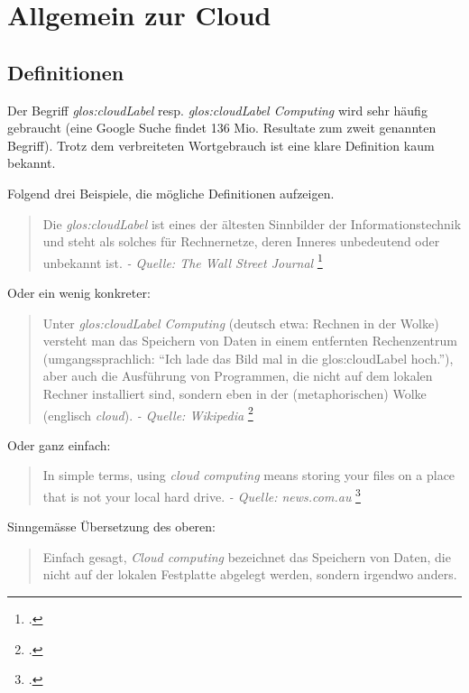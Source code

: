 \chapter{Allgemein zur Cloud}

\section{Definitionen}
\label{sec:cloud:definition}

Der Begriff \textit{\Gls{glos:cloudLabel}} resp. \textit{\Gls{glos:cloudLabel} Computing} wird sehr häufig gebraucht (eine Google Suche findet 136 Mio. Resultate zum zweit genannten Begriff).
Trotz dem verbreiteten Wortgebrauch ist eine klare Definition kaum bekannt.

Folgend drei Beispiele, die mögliche Definitionen aufzeigen.

\begin{quote}
	Die \textit{\Gls{glos:cloudLabel}} ist eines der ältesten Sinnbilder der Informationstechnik und steht als solches für Rechnernetze, deren Inneres unbedeutend oder unbekannt ist. \textit{- Quelle: The Wall Street Journal}  \footcite{The_Internet_Industry_Is_on_a_Cloud_--_Whatever_That_May_Mean_-_WSJ_2014-10-03}
\end{quote}

Oder ein wenig konkreter:

\begin{quote}
	Unter \textit{\Gls{glos:cloudLabel} Computing} (deutsch etwa: Rechnen in der Wolke) versteht man das Speichern von Daten in einem entfernten Rechenzentrum (umgangssprachlich: "`Ich lade das Bild mal in die \Gls{glos:cloudLabel} hoch."'), aber auch die Ausführung von Programmen, die nicht auf dem lokalen Rechner installiert sind, sondern eben in der (metaphorischen) Wolke (englisch \textit{cloud}). \textit{- Quelle: Wikipedia} \footcite{Cloud_Computing__Wikipedia_2014-10-03}
\end{quote}

Oder ganz einfach:

\begin{quote}
	In simple terms, using \textit{cloud computing} means storing your files on a place that is not your local hard drive.  \textit{- Quelle: news.com.au} \footcite{What_really_is_The_Cloud?_And_how_does_it_work?_A_simple_explainer_2014-10-31}
\end{quote}

Sinngemässe Übersetzung des oberen:
\begin{quote}
	Einfach gesagt, \textit{Cloud computing} bezeichnet das Speichern von Daten, die nicht auf der lokalen Festplatte abgelegt werden, sondern irgendwo anders.
\end{quote}

